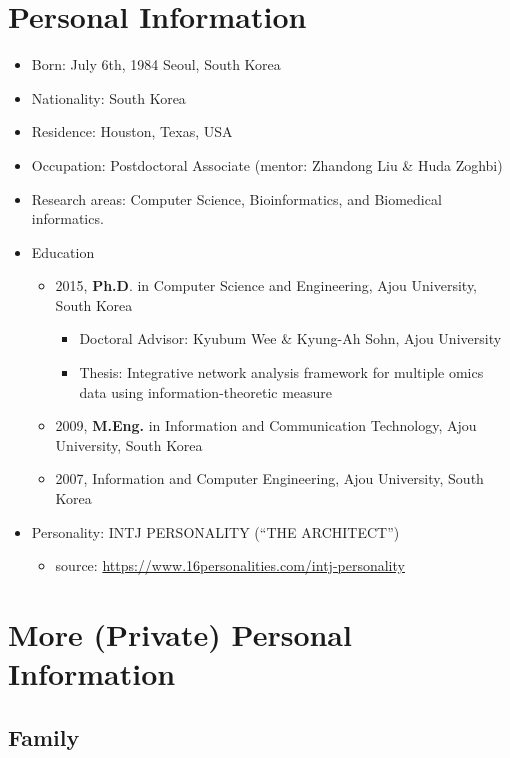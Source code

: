 \documentclass[a0,portrait]{a0poster}
\begin{document}
\begin{multicols}{2}
\section*{Personal Information}

\begin{itemize}
\item Born: July 6th, 1984 Seoul, South Korea
\item Nationality: South Korea
\item Residence: Houston, Texas, USA
\item Occupation: Postdoctoral Associate (mentor: Zhandong Liu \& Huda Zoghbi)
\item Research areas: Computer Science, Bioinformatics, and Biomedical informatics.
\item{Education}
  \begin{itemize}
  	\item 2015, \textbf{Ph.D}. in Computer Science and Engineering, Ajou University, South Korea
    	\begin{itemize}
          \item Doctoral Advisor: Kyubum Wee \& Kyung-Ah Sohn, Ajou University
          \item Thesis: Integrative network analysis framework for multiple omics data using information-theoretic measure
         \end{itemize}
  	\item 2009,
    \textbf{M.Eng.} in Information and Communication Technology, Ajou University, South Korea
  	\item 2007, Information and Computer Engineering, Ajou University, South Korea
  \end{itemize}
  
\item Personality: INTJ PERSONALITY (``THE ARCHITECT'')
	\begin{itemize} 
    	\item source: \url{https://www.16personalities.com/intj-personality}
    \end{itemize}
\end{itemize}

\section*{More (Private) Personal Information}

\subsection*{Family}


\end{multicols}
\end{document}
